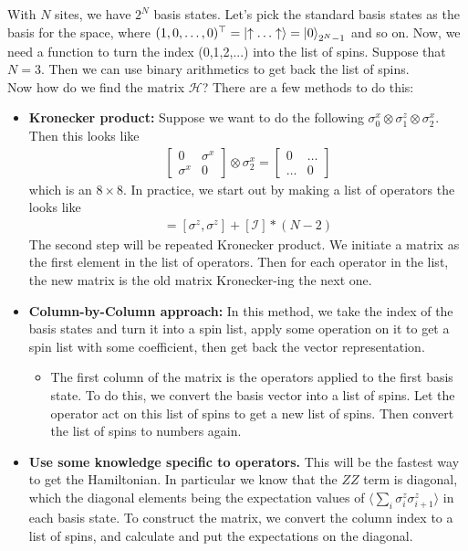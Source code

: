 \documentclass{book}
\theoremstyle{definition}
\newcommand{\had}{\mathcal{H}}
\newcommand{\la}{\langle}
\newcommand{\ra}{\rangle}
\newcommand{\Id}{\mathcal{I}}
\begin{document}
With $N$ sites, we have $2^N$ basis states. Let's pick the standard basis states as the basis for the space, where $(1,0,\dots,0)^\top = \ket{\uparrow\dots\uparrow} = \ket{0}_{2^N-1}$ and so on. Now, we need a function to turn the index (0,1,2,...) into the list of spins. Suppose that $N=3$. Then we can use binary arithmetics to get back the list of spins. \\

Now how do we find the matrix $\had$? There are a few methods to do this:
\begin{itemize}
	\item \textbf{Kronecker product:} Suppose we want to do the following $\sigma_0^x \otimes \sigma_1^z \otimes \sigma_2^x$. Then this looks like
	\begin{align}
	\begin{bmatrix}
	0 & \sigma^x \\ \sigma^x & 0  
	\end{bmatrix}\otimes \sigma_2^x = \begin{bmatrix}
	0 &  \dots  \\ \dots  & 0
	\end{bmatrix}
	\end{align}
	which is an $8\times 8$. In practice, we start out by making a list of operators the looks like
	\begin{align}
	[\sigma^z\sigma^z, \Id, \Id,\dots \Id] = [\sigma^z,\sigma^z] + [\Id]*(N-2)
	\end{align}
	The second step will be repeated Kronecker product. We initiate a matrix as the first element in the list of operators. Then for each operator in the list, the new matrix is the old matrix Kronecker-ing the next one. 
	
	
	
	\item \textbf{Column-by-Column approach:} In this method, we take the index of the basis states and turn it into a spin list, apply some operation on it to get a spin list with some coefficient, then get back the vector representation. 
	\begin{itemize}
		\item The first column of  the matrix is the operators applied to the first basis state. To do this, we convert the basis vector into a list of spins. Let the operator act on this list of spins to get a new list of spins. Then convert the list of spins to numbers again. 
	\end{itemize}
	
	
	\item \textbf{Use some knowledge specific to operators.} This will be the fastest way to get the Hamiltonian. In particular we know that the $ZZ$ term is diagonal, which the diagonal elements being the expectation values of  $\la \sum_i \sigma_i^z \sigma_{i+1}^z  \ra$ in each basis state. To construct the matrix, we convert the column index to a list of spins, and calculate and put the expectations on the diagonal.
\end{itemize}   
\end{document}
